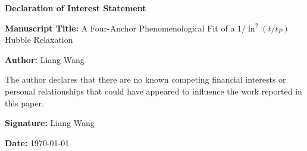 \documentclass[11pt]{article}
\begin{document}
\begin{center}
\Large\textbf{Declaration of Interest Statement}
\end{center}

\vspace{1cm}

\noindent\textbf{Manuscript Title:} A Four-Anchor Phenomenological Fit of a $1/\ln^2(t/t_P)$ Hubble Relaxation

\vspace{0.5cm}

\noindent\textbf{Author:} Liang Wang

\vspace{1cm}

\noindent The author declares that there are no known competing financial interests or personal relationships that could have appeared to influence the work reported in this paper.

\vspace{2cm}

\noindent\textbf{Signature:} Liang Wang

\noindent\textbf{Date:} \today
\end{document}
